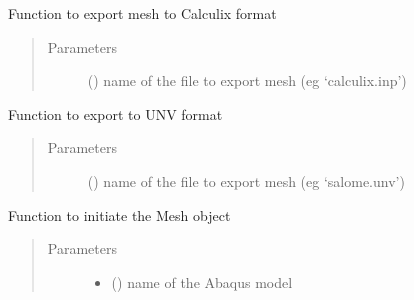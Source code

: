 \documentclass[letterpaper,10pt,english]{sphinxmanual}
\begin{document}
\begin{fulllineitems}
\begin{fulllineitems}
\label{\detokenize{pyCofea/api:cofea.Mesh.exportToCalculix}}
Function to export mesh to Calculix format
\begin{quote}\begin{description}
\item[{Parameters}] \leavevmode
{} () \textendash{} name of the file to export mesh (eg ‘calculix.inp’)

\end{description}\end{quote}

\end{fulllineitems}


\begin{fulllineitems}
\label{\detokenize{pyCofea/api:cofea.Mesh.exportToUnvFormat}}
Function to export to UNV format
\begin{quote}\begin{description}
\item[{Parameters}] \leavevmode
{} () \textendash{} name of the file to export mesh (eg ‘salome.unv’)

\end{description}\end{quote}

\end{fulllineitems}


\begin{fulllineitems}
\label{\detokenize{pyCofea/api:cofea.Mesh.importFromAbaqusCae}}
Function to initiate the Mesh object
\begin{quote}\begin{description}
\item[{Parameters}] \leavevmode\begin{itemize}
\item {} 
 () \textendash{} name of the Abaqus model


\end{itemize}
\end{description}
\end{quote}
\end{fulllineitems}
\end{fulllineitems}
\end{document}
